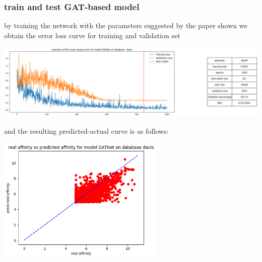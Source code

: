 \documentclass[11pt, a4paper]{article}
\begin{document}
        \subsubsection{train and test GAT-based model}
        by training the network with the parameters suggested by the paper shown we obtain the error loss curve for training and validation set 
        \begin{center}
            \includegraphics[width=1.0\textwidth]{train_test_plots/davis GAT train.png}
        \end{center}
        and the resulting predicted-actual curve is as follows:
        \begin{center}
            \includegraphics[width=0.6\textwidth]{train_test_plots/davis GAT test.png}
        \end{center}
\end{document}
